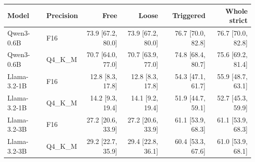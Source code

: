 \begin{tabular}{llrrrr}
\toprule
Model & Precision & Free & Loose & Triggered & Whole strict \\
\midrule
Qwen3-0.6B & F16 & 73.9 [67.2, 80.0] & 73.9 [67.2, 80.0] & 76.7 [70.0, 82.8] & 76.7 [70.0, 82.8] \\
Qwen3-0.6B & Q4\_K\_M & 70.7 [64.0, 77.0] & 70.7 [63.9, 77.0] & 74.8 [68.4, 80.7] & 75.6 [69.2, 81.4] \\
Llama-3.2-1B & F16 & 12.8 [8.3, 17.8] & 12.8 [8.3, 17.8] & 54.3 [47.1, 61.7] & 55.9 [48.7, 63.1] \\
Llama-3.2-1B & Q4\_K\_M & 14.2 [9.3, 19.4] & 14.1 [9.2, 19.4] & 51.9 [44.7, 59.1] & 52.7 [45.3, 59.9] \\
Llama-3.2-3B & F16 & 27.2 [20.6, 33.9] & 27.2 [20.6, 33.9] & 61.1 [53.9, 68.3] & 61.1 [53.9, 68.3] \\
Llama-3.2-3B & Q4\_K\_M & 29.2 [22.7, 35.9] & 29.4 [22.8, 36.1] & 60.4 [53.3, 67.6] & 61.0 [53.9, 68.1] \\
\bottomrule
\end{tabular}
